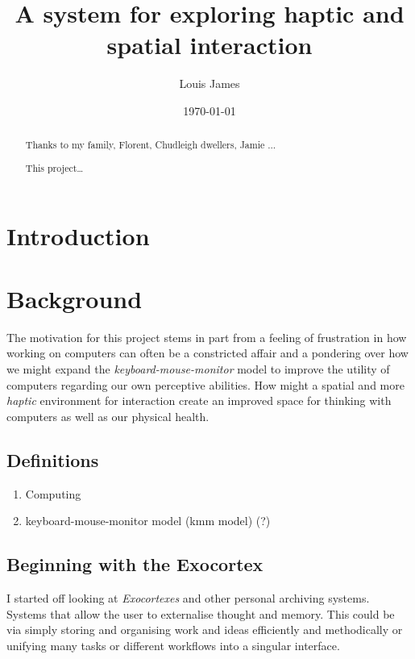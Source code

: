 \documentclass[12pt]{report}
\author{Louis James}
\date{\today}
\title{A system for exploring haptic and spatial interaction}
\begin{document}
\maketitle
\renewcommand{\abstractname}{Acknowledgements}
\begin{abstract}
 Thanks to my family, Florent, Chudleigh dwellers, Jamie ...
\end{abstract}
\newpage

\renewcommand{\abstractname}{Abstract}
\begin{abstract}
This project\ldots{}
\end{abstract}
\tableofcontents
\listoffigures
\chapter{Introduction}
\label{sec:org41d9406}
\chapter{Background}
\label{sec:orgf25dcaa}

The motivation for this project stems in part from a feeling of frustration in
how working on computers can often be a constricted affair and a pondering over
how we might expand the \emph{keyboard-mouse-monitor} model to improve the utility of
computers regarding our own perceptive abilities. How might a spatial and more
\emph{haptic} environment for interaction create an improved space for thinking with
computers as well as our physical health.

\section{Definitions}
\label{sec:org6cd57f5}
\begin{enumerate}
\item Computing
\label{sec:orgc9a1233}
\item keyboard-mouse-monitor model (kmm model) (?)
\label{sec:orga811450}
\end{enumerate}

\section{Beginning with the Exocortex}
\label{sec:org79f4dcb}

I started off looking at \emph{Exocortexes} and other personal archiving systems.
Systems that allow the user to externalise thought and memory. This could be via
simply storing and organising work and ideas efficiently and methodically or
unifying many tasks or different workflows into a singular interface. \\
\end{document}
